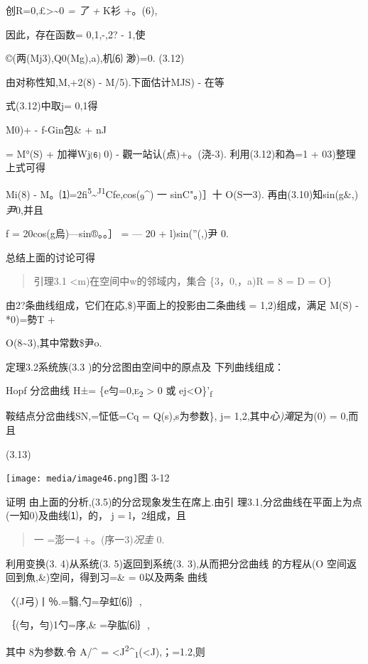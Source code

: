 \documentclass{article}
\begin{document}
创R=0,£\textgreater{}\textasciitilde{}0 \emph{= 了 +} K衫 +。(6),

因此，存在函数= 0,1,-,2? - 1,使

©(两(Mj3),Q0(Mg),a),机⑹ 渺)=0. (3.12)

由对称性知,M,+2(8) - M/5).下面估计MJS) - 在等

式(3.12)中取j= 0,1得

M0)+ - f-Gin包\& + nJ

= M°(S) + 加禅Wj⑹ 0) - 觀一站认(点)+。(浇-3). 利用(3.12)和為=1 +
03)整理上式可得

Mi(8) -
M。⑴=2fi\textsuperscript{5}\textasciitilde{}\textsuperscript{J1}Cfe,cos(\textsubscript{9}\^{})
一 sinC"。)］十 O(S一3). 再由(3.10)知sin(g\&,)\emph{尹}0,并且

f = 20cos(g烏)---sin®。。］ = --- 20 + l)sin(''(,)尹 0.

总结上面的讨论可得

\begin{quote}
引理3.1 \textless{}m)在空间中w的邻域内，集合 \{3，0,，a)\textbar{}R = 8
= D = O\}
\end{quote}

由2?条曲线组成，它们在応,\$)平面上的投影由二条曲线 = 1,2)组成，满足 M(S)
- *0)=勢T +

O(8\textasciitilde{}3),其中常数\$尹o.

定理3.2系统族(3.3 )的分岔图由空间中的原点及 下列曲线组成：

Hopf 分岔曲线 H±= \{e\textbar{}勻=\textsc{0,e\textsubscript{2}}
\textgreater{} 0 或 ej\textless{}O\}'\textsubscript{f}

鞍结点分岔曲线SN,=怔低=Cq = Q(s),s为参数\}, j=
1,2,其中\emph{心)滝}足为(0) = 0,而且

(3.13)

\texttt{[image: media/image46.png]}图
3-12

证明 由上面的分析,(3.5)的分岔现象发生在席上.由引
理3.1,分岔曲线在平面上为点(一知0)及曲线⑴，的， j = l，2组成，且

\begin{quote}
一 =澎一4 +。(序一3)\emph{况圭} 0.
\end{quote}

利用变换(3. 4)从系统(3. 5)返回到系统(3. 3),从而把分岔曲线 的方程从(O
空间返回到魚,\&)空间，得到习=\& = 0以及两条 曲线

〈(J弓)丨％.=翳,勺=孕虹⑹｝,

｛(勻，勻)1勺=序,\& =孕肱⑹｝,

其中 8为参数.令 A/\^{} =
\textless{}J\textsuperscript{2}\^{}\textsubscript{1}(\textless{}J),；=1.2,则
\end{document}
